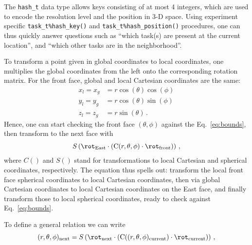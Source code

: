 \documentclass[paper=a4,fontsize=11pt]{scrartcl}
\numberwithin{equation}{section}		%
\numberwithin{figure}{section}			%
\numberwithin{table}{section}				%
\newcommand{\codecolor}{\color{Blue}}
\newcommand{\Code}[1]{{\codecolor\texttt{#1}}}
\begin{document}
The \Code{hash\_t} data type allows keys consisting of at most 4 integers, which are used to encode the resolution level and the position in 3-D space.  Using experiment specific \Code{task\_t\%hash\_key()} and \Code{task\_t\%hash\_position()} procedures, one can thus quickly answer questions such as ``which task(s) are present at the current location'', and ``which other tasks are in the neighborhood''.

To transform a point given in global coordinates to local coordinates, one multiplies the global coordinates from the left onto the corresponding rotation matrix.  For the front face, global and local Cartesian coordinates are the same:
\begin{align}
    x_l = x_g &= r \cos(\theta) \cos(\phi) \\
    y_l = y_g &= r \cos(\theta) \sin(\phi)  \\
    z_l = z_g &= r \sin(\theta) \,.
\end{align}
Hence, one can start checking the front face $(\theta,\phi)$ against the Eq.\ \ref{eq:bounds}, then transform to the next face with
\begin{equation}
    S\left( \rot_\mathrm{East}\cdot(\mbox{C}(r,\theta,\phi) \cdot \rot_\mathrm{front}) \right) \,,
\end{equation}
where $C()$ and $S()$ stand for transformations to local Cartesian and spherical coordinates, respectively.  The equation thus spells out: transform the local front face spherical coordinates to local Cartesian coordinates, then via global Cartesian coordinates to local Cartesian coordinates on the East face, and finally transform those to local spherical coordinates, ready to check against Eq.\ \ref{eq:bounds}.  

To define a general relation we can write
\begin{equation}
    (r,\theta,\phi)_\mathrm{next} = S\left( \rot_\mathrm{next}\cdot(\mbox{C}((r,\theta,\phi)_\mathrm{current}) \cdot \rot_\mathrm{current}) \right) \,,
\end{equation}
\end{document}
